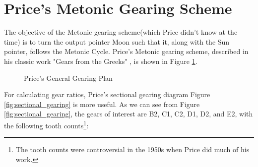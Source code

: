 \documentclass[11pt, oneside]{article}   	%
\theoremstyle{definition}
\begin{document}
\section{Price's Metonic Gearing Scheme}
The objective of the Metonic gearing scheme(which Price didn't know at the time) is to turn the output pointer Moon such that it, along with the Sun pointer, follows the Metonic Cycle.
Price's Metonic gearing scheme, described in his classic work "Gears from the Greeks" \cite{gears_from_the_greeks}, is shown in Figure \ref{fig:general_gearing_plan}. 

\begin{figure}[H]
\caption{Price's General Gearing Plan \cite{gears_from_the_greeks}}
\label{fig:general_gearing_plan}
\end{figure}

\bigskip
\noindent
For calculating gear ratios,  Price's sectional gearing diagram Figure \ref{fig:sectional_gearing} is more useful. As we can see from Figure \ref{fig:sectional_gearing}, the gears of interest
are B2, C1, C2, D1, D2, and E2, with the following tooth counts\footnote{The tooth counts were controversial in the 1950s when Price did much of his work.}:
\end{document}
